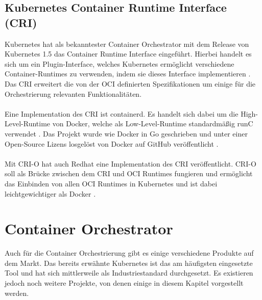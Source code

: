 \subsection{Kubernetes Container Runtime Interface (CRI)}
Kubernetes hat als bekanntester Container Orchestrator mit dem Release von Kubernetes 1.5 das Container Runtime Interface eingeführt. Hierbei handelt es sich um ein Plugin-Interface, welches Kubernetes ermöglicht verschiedene Container-Runtimes zu verwenden, indem sie dieses Interface implementieren \cite{noauthor_cri_2021}. Das CRI erweitert die von der OCI definierten Spezifikationen um einige für die Orchestrierung relevanten Funktionalitäten.
\\\\
Eine Implementation des CRI ist containerd. Es handelt sich dabei um die High-Level-Runtime von Docker, welche als Low-Level-Runtime standardmäßig runC verwendet \cite{evan_baker_comprehensive_2021}. Das Projekt wurde wie Docker in Go geschrieben und unter einer Open-Source Lizens losgelöst von Docker auf GitHub veröffentlicht \cite{noauthor_containerd_2021}.
\\\\
Mit CRI-O hat auch Redhat eine Implementation des CRI veröffentlicht. CRI-O soll als Brücke zwischen dem CRI und OCI Runtimes fungieren und ermöglicht das Einbinden von allen OCI Runtimes in Kubernetes und ist dabei leichtgewichtiger als Docker \cite{noauthor_cri-o_2021}.

\section{Container Orchestrator}
Auch für die Container Orchestrierung gibt es einige verschiedene Produkte auf dem Markt. Das bereits erwähnte Kubernetes ist das am häufigsten eingesetzte Tool und hat sich mittlerweile als Industriestandard durchgesetzt. Es existieren jedoch noch weitere Projekte, von denen einige in diesem Kapitel vorgestellt werden.

